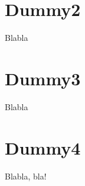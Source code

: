 \documentclass[a4paper,10pt,onecolumn,titlepage]{article}
\begin{document}





\renewcommand\contentsname{Table of Contents}
\tableofcontents



\section{Dummy2}

Blabla

\section{Dummy3}

Blabla

\section{Dummy4}

Blabla, bla!
\end{document}
